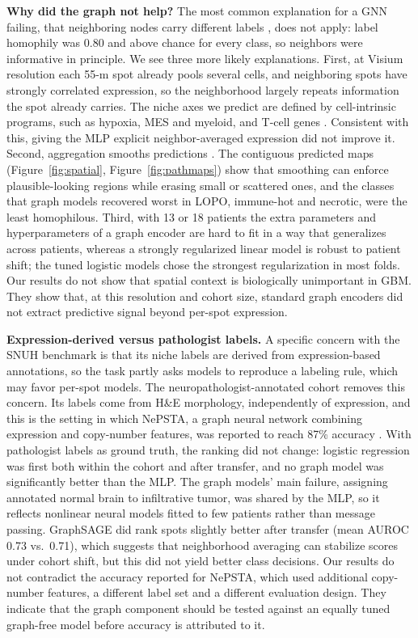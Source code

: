 \documentclass[11pt,letterpaper]{article}
\begin{document}
\textbf{Why did the graph not help?} The most common explanation for a GNN failing, that neighboring nodes carry different labels \cite{zhu2020homophily}, does not apply: label homophily was 0.80 and above chance for every class, so neighbors were informative in principle. We see three more likely explanations. First, at Visium resolution each 55-\textmu m spot already pools several cells, and neighboring spots have strongly correlated expression, so the neighborhood largely repeats information the spot already carries. The niche axes we predict are defined by cell-intrinsic programs, such as hypoxia, MES and myeloid, and T-cell genes \cite{neftel2019,greenwald2024}. Consistent with this, giving the MLP explicit neighbor-averaged expression did not improve it. Second, aggregation smooths predictions \cite{li2018deeper}. The contiguous predicted maps (Figure~\ref{fig:spatial}, Figure~\ref{fig:pathmaps}) show that smoothing can enforce plausible-looking regions while erasing small or scattered ones, and the classes that graph models recovered worst in LOPO, immune-hot and necrotic, were the least homophilous. Third, with 13 or 18 patients the extra parameters and hyperparameters of a graph encoder are hard to fit in a way that generalizes across patients, whereas a strongly regularized linear model is robust to patient shift; the tuned logistic models chose the strongest regularization in most folds. Our results do not show that spatial context is biologically unimportant in GBM. They show that, at this resolution and cohort size, standard graph encoders did not extract predictive signal beyond per-spot expression.

\textbf{Expression-derived versus pathologist labels.} A specific concern with the SNUH benchmark is that its niche labels are derived from expression-based annotations, so the task partly asks models to reproduce a labeling rule, which may favor per-spot models. The neuropathologist-annotated cohort removes this concern. Its labels come from H\&E morphology, independently of expression, and this is the setting in which NePSTA, a graph neural network combining expression and copy-number features, was reported to reach 87\% accuracy \cite{ritter2025}. With pathologist labels as ground truth, the ranking did not change: logistic regression was first both within the cohort and after transfer, and no graph model was significantly better than the MLP. The graph models' main failure, assigning annotated normal brain to infiltrative tumor, was shared by the MLP, so it reflects nonlinear neural models fitted to few patients rather than message passing. GraphSAGE did rank spots slightly better after transfer (mean AUROC 0.73 vs.\ 0.71), which suggests that neighborhood averaging can stabilize scores under cohort shift, but this did not yield better class decisions. Our results do not contradict the accuracy reported for NePSTA, which used additional copy-number features, a different label set and a different evaluation design. They indicate that the graph component should be tested against an equally tuned graph-free model before accuracy is attributed to it.
\end{document}
